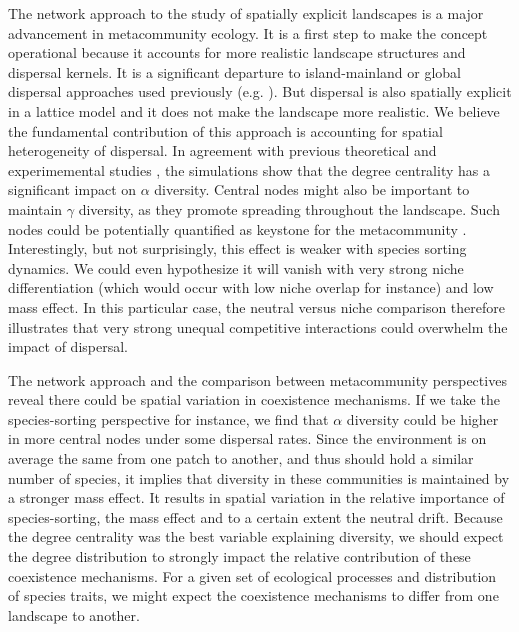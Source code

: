 \documentclass[12pt]{article}
\begin{document}
The network approach to the study of spatially explicit landscapes is a major
advancement in metacommunity ecology. It is a first step to make the concept
operational because it accounts for more realistic landscape structures and
dispersal kernels. It is a significant departure to island-mainland or
global dispersal approaches used previously (e.g. \parencite{Tilman1994a,
Hubbell2001, Mouquet2002}). But dispersal is also spatially explicit in a
lattice model and it does not make the landscape more realistic. We believe the
fundamental contribution of this approach is accounting for spatial
heterogeneity of dispersal. In agreement with previous theoretical
\parencite{Economo2011, Desjardins2012b} and experimemental studies
\parencite{Carrara2012}, the simulations show that the degree centrality has a
significant impact on $\alpha$ diversity. Central nodes might also be important
to maintain $\gamma$ diversity, as they promote spreading
throughout the landscape. Such nodes could be potentially quantified as keystone
for the metacommunity \parencite{Mouquet2013}. Interestingly, but not
surprisingly, this effect is weaker with species sorting dynamics. We could even
hypothesize it will vanish with very strong niche differentiation (which would occur with
low niche overlap for instance) and low mass effect. In this particular case, the
neutral versus niche comparison therefore illustrates that very strong unequal
competitive interactions could overwhelm the impact of dispersal.

The network approach and the comparison between metacommunity perspectives
reveal there could be spatial variation in coexistence mechanisms. If we take
the species-sorting perspective for instance, we find that $\alpha$ diversity
could be higher in more central nodes under some dispersal rates. Since the
environment is on average the same from one patch to another, and thus should
hold a similar number of species, it implies that diversity in these communities
is maintained by a stronger mass effect. It results in spatial variation in the
relative importance of species-sorting, the mass effect and to a certain extent
the neutral drift. Because the degree centrality was the best variable
explaining diversity, we should expect the degree distribution to strongly
impact the relative contribution of these coexistence mechanisms. For a given
set of ecological processes and distribution of species traits, we might expect
the coexistence mechanisms to differ from one landscape to another.
\end{document}
